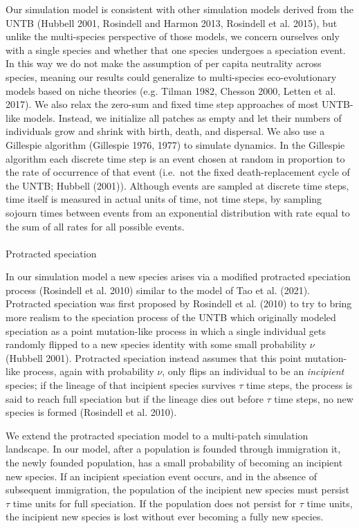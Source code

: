 \documentclass[
  letterpaper,
  DIV=11,
  numbers=noendperiod]{scrartcl}
\makeatletter
\let\oldparagraph\paragraph
\renewcommand{\paragraph}{
    \@ifstar
      \xxxParagraphStar
      \xxxParagraphNoStar
  }
\newcommand{\xxxParagraphStar}[1]{\oldparagraph*{#1}\mbox{}}
\newcommand{\xxxParagraphNoStar}[1]{\oldparagraph{#1}\mbox{}}
\makeatother
\begin{document}
Our simulation model is consistent with other simulation models derived
from the UNTB (Hubbell 2001, Rosindell and Harmon 2013, Rosindell et al.
2015), but unlike the multi-species perspective of those models, we
concern ourselves only with a single species and whether that one
species undergoes a speciation event. In this way we do not make the
assumption of per capita neutrality across species, meaning our results
could generalize to multi-species eco-evolutionary models based on niche
theories (e.g. Tilman 1982, Chesson 2000, Letten et al. 2017). We also
relax the zero-sum and fixed time step approaches of most UNTB-like
models. Instead, we initialize all patches as empty and let their
numbers of individuals grow and shrink with birth, death, and dispersal.
We also use a Gillespie algorithm (Gillespie 1976, 1977) to simulate
dynamics. In the Gillespie algorithm each discrete time step is an event
chosen at random in proportion to the rate of occurrence of that event
(i.e.~not the fixed death-replacement cycle of the UNTB; Hubbell
(2001)). Although events are sampled at discrete time steps, time itself
is measured in actual units of time, not time steps, by sampling sojourn
times between events from an exponential distribution with rate equal to
the sum of all rates for all possible events.

\paragraph{Protracted speciation}\label{protracted-speciation}

In our simulation model a new species arises via a modified protracted
speciation process (Rosindell et al. 2010) similar to the model of Tao
et al. (2021). Protracted speciation was first proposed by Rosindell et
al. (2010) to try to bring more realism to the speciation process of the
UNTB which originally modeled speciation as a point mutation-like
process in which a single individual gets randomly flipped to a new
species identity with some small probability \(\nu\) (Hubbell 2001).
Protracted speciation instead assumes that this point mutation-like
process, again with probability \(\nu\), only flips an individual to be
an \emph{incipient} species; if the lineage of that incipient species
survives \(\tau\) time steps, the process is said to reach full
speciation but if the lineage dies out before \(\tau\) time steps, no
new species is formed (Rosindell et al. 2010).

We extend the protracted speciation model to a multi-patch simulation
landscape. In our model, after a population is founded through
immigration it, the newly founded population, has a small probability of
becoming an incipient new species. If an incipient speciation event
occurs, and in the absence of subsequent immigration, the population of
the incipient new species must persist \(\tau\) time units for full
speciation. If the population does not persist for \(\tau\) time units,
the incipient new species is lost without ever becoming a fully new
species.
\end{document}
